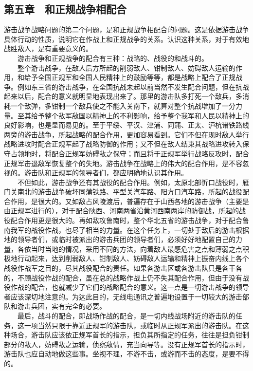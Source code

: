 \documentclass[cn,11pt,chinese]{elegantbook}
\def\myformat#1{\hfil\hfil #1}
\begin{document}
\subsection*{\myformat{第五章　和正规战争相配合}}
游击战争战略问题的第二个问题，是和正规战争相配合的问题。这是依据游击战争具体行动的性质，说明它在作战上和正规战争的关系。认识这种关系，对于有效地战胜敌人，是有重要意义的。\\
　　游击战争和正规战争的配合有三种：战略的、战役的和战斗的。\\
　　整个游击战争，在敌人后方所起的削弱敌人、钳制敌人、妨碍敌人运输的作用，和给予全国正规军和全国人民精神上的鼓励等等，都是战略上配合了正规战争。例如东三省的游击战争，在全国抗战未起以前当然不发生配合问题，但在抗战起来以后，配合的意义就明显地表现出来了。那里的游击队多打死一个敌兵，多消耗一个敌弹，多钳制一个敌兵使之不能入关南下，就算对整个抗战增加了一分力量。至其给予整个敌军敌国以精神上的不利影响，给予整个我军和人民以精神上的良好影响，也是显而易见的。至于平绥、平汉、津浦、同蒲、正太、沪杭诸铁路线两旁的游击战争，所起战略的配合作用，更加容易看到。它们不但在现时敌人举行战略进攻时配合正规军起了战略防御的作用；又不但在敌人结束其战略进攻转入保守占领地时，将配合正规军妨碍敌之保守；而且将于正规军举行战略反攻时，配合正规军击退敌军恢复整个的失地。游击战争在战略上的伟大的配合作用，是不容忽视的。游击队和正规军的领导者们，都应明确地认识其作用。\\
　　不但如此，游击战争还有其战役的配合作用。例如，太原北部忻口战役时，雁门关南北的游击战争破坏同蒲铁路、平型关汽车路、阳方口汽车路，所起的战役配合作用，是很大的。又如敌占风陵渡后，普遍存在于山西各地的游击战争（主要是由正规军进行的），对于配合陕西、河南两省沿黄河西南两岸的防御战，所起的战役配合作用更是很大的。再如敌攻鲁南时，整个华北五省的游击战争，对于配合鲁南我军的战役作战，也尽了相当的力量。在这个任务上，一切处于敌后的游击根据地的领导者们，或临时被派出的游击兵团的领导者们，必须好好地配置自己的力量，各依当时当地的情况，采用不同的方法，向着敌人最感危害之点和薄弱之点积极地行动起来，达到削弱敌人、钳制敌人、妨碍敌人运输和精神上振奋内线上各个战役作战军之目的，尽其战役配合的责任。如果各游击区或各游击队只是各干各的，不顾战役作战的配合，虽在总的战略作战上仍不失其配合作用，但由于没有战役作战的配合，也就减少了它们的战略配合的意义。这一点是一切游击战争的领导者应该深切地注意的。为达此目的，无线电通讯之普遍地设置于一切较大的游击部队和游击兵团，实有完全的必要。\\
　　最后，战斗的配合，即战场作战的配合，是一切内线战场附近的游击队的任务，这一项当然只限于靠近正规军的游击队，或临时从正规军派出的游击队。在这种场合，游击队应该依正规军首长的指示，担负其所指定的任务，往往是担负钳制部分的敌人，妨碍敌之运输，侦察敌情，充当向导等。没有正规军首长的指示时，游击队也应自动地做这些事。坐视不理，不游不击，或游而不击的态度，是要不得的。\\
\end{document}
